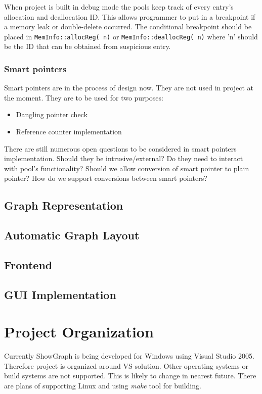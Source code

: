 \documentclass[11pt,twoside,a4paper]{article}
\begin{document}
When project is built in debug mode the pools keep track of every entry's allocation and deallocation ID. This allows programmer to put in a breakpoint if a memory leak or double-delete occurred. The conditional breakpoint should be placed in \lstinline{MemInfo::allocReg( n)} or \lstinline{MemInfo::deallocReg( n)} where 'n' should be the ID that can be obtained from suspicious entry.

\subsubsection{Smart pointers}
Smart pointers are in the process of design now. They are not used in project at the moment. They are to be used for two purposes:
\begin{itemize}
\item Dangling pointer check
\item Reference counter implementation
\end{itemize}

There are still numerous open questions to be considered in smart pointers implementation. Should they be intrusive/external? Do they need to interact with pool's functionality? Should we allow conversion of smart pointer to plain pointer? How do we support conversions between smart pointers?

\subsection{Graph Representation}


\subsection{Automatic Graph Layout}


\subsection{Frontend}


\subsection{GUI Implementation}


\section{Project Organization}
Currently ShowGraph is being developed for Windows using Visual Studio 2005. Therefore project is organized around VS solution. Other operating systems or build systems are not supported. This is likely to change in nearest future. There are plans of supporting Linux and using \emph{make} tool for building.
\end{document}
